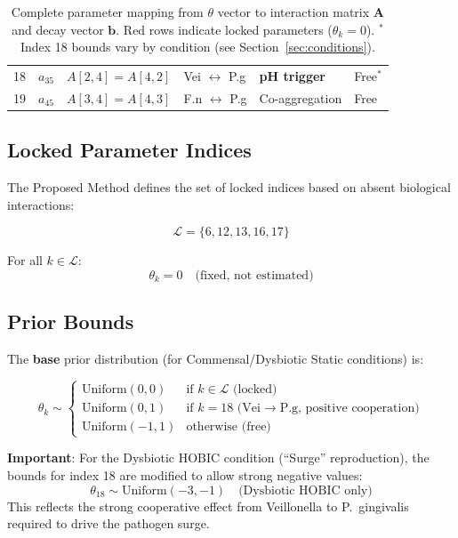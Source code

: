 \documentclass[11pt,a4paper]{article}
\begin{document}
\begin{table}[h]
\begin{tabular}{ccllll}
18 & $a_{35}$ & $A[2,4]=A[4,2]$ & Vei $\leftrightarrow$ P.g & \textbf{pH trigger} & Free$^*$ \\
19 & $a_{45}$ & $A[3,4]=A[4,3]$ & F.n $\leftrightarrow$ P.g & Co-aggregation & Free \\
\bottomrule
\end{tabular}
\caption{Complete parameter mapping from $\theta$ vector to interaction matrix $\mathbf{A}$ and decay vector $\mathbf{b}$. Red rows indicate locked parameters ($\theta_k = 0$). $^*$Index 18 bounds vary by condition (see Section~\ref{sec:conditions}).}
\label{tab:theta_mapping}
\end{table}

\subsection{Locked Parameter Indices}

The Proposed Method defines the set of locked indices based on absent biological interactions:

\begin{equation}
\mathcal{L} = \{6, 12, 13, 16, 17\}
\end{equation}

For all $k \in \mathcal{L}$:
\begin{equation}
\theta_k = 0 \quad \text{(fixed, not estimated)}
\end{equation}

\subsection{Prior Bounds}
\label{sec:prior_bounds}

The \textbf{base} prior distribution (for Commensal/Dysbiotic Static conditions) is:

\begin{equation}
\theta_k \sim \begin{cases}
\text{Uniform}(0, 0) & \text{if } k \in \mathcal{L} \text{ (locked)} \\
\text{Uniform}(0, 1) & \text{if } k = 18 \text{ (Vei} \to \text{P.g, positive cooperation)} \\
\text{Uniform}(-1, 1) & \text{otherwise (free)}
\end{cases}
\end{equation}

\textbf{Important}: For the Dysbiotic HOBIC condition (``Surge'' reproduction), the bounds for index 18 are modified to allow strong negative values:
\begin{equation}
\theta_{18} \sim \text{Uniform}(-3, -1) \quad \text{(Dysbiotic HOBIC only)}
\end{equation}
This reflects the strong cooperative effect from Veillonella to P.~gingivalis required to drive the pathogen surge.
\end{document}

